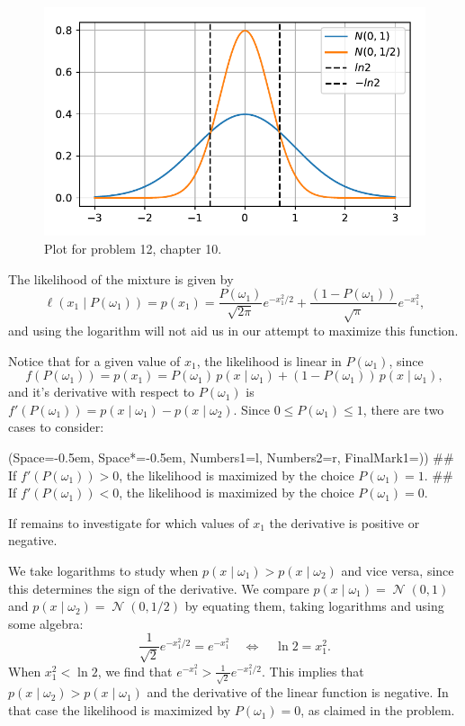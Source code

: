 \documentclass[12pt, a4paper]{article}
\newcommand{\listSpace}{-0.5em}%
\DeclareMathOperator{\N}{\mathcal{N}}
\begin{document}
{\begin{easylist}[enumerate]
		\begin{figure}[ht!]
			\centering
			\includegraphics[width=0.6\linewidth]{figs/duda_ch10_prob12.pdf}
			\caption{Plot for problem 12, chapter 10.}
			\label{fig:ch10_prob12}
		\end{figure}
	
	
	The likelihood of the mixture is given by 
	\begin{equation*}
		\ell (x_1 \mid  P(\omega_1)) = p(x_1) = \frac{P(\omega_1)}{\sqrt{2 \pi}} e^{-x_1^2 / 2}
		+
		\frac{(1 - P(\omega_1))}{\sqrt{ \pi}} e^{-x_1^2 },
	\end{equation*}
	and using the logarithm will not aid us in our attempt to maximize this function.
	
	Notice that for a given value of $x_1$, the likelihood is linear in $P(\omega_1)$, since
	\begin{equation*}
		f( P(\omega_1) ) = p(x_1) = P(\omega_1) \, p(x \mid \omega_1) + (1 - P(\omega_1)) \, p(x \mid \omega_1),
	\end{equation*}
	and it's derivative with respect to $P( \omega_1)$ is $f'(P( \omega_1)) = p(x \mid \omega_1) - p(x \mid \omega_2)$.
	Since $0 \leq P(\omega_1) \leq 1$, there are two cases to consider:
	
	\begin{easylist}[enumerate]
		\ListProperties(Space=\listSpace, Space*=\listSpace, Numbers1=l, Numbers2=r, FinalMark1={)})
	## If $f'(P( \omega_1))  > 0$, the likelihood is maximized by the choice $P(\omega_1) = 1$.
	## If $f'(P( \omega_1)) < 0$, the likelihood is maximized by the choice $P(\omega_1) = 0$.
	\end{easylist}
	
	If remains to investigate for which values of $x_1$ the derivative is positive or negative.
	
	We take logarithms to study when $p(x \mid \omega_1) > p(x \mid \omega_2)$ and vice versa, since this determines the sign of the derivative.
	We compare $p(x \mid \omega_1) = \N(0, 1)$ and $p(x \mid \omega_2) = \N(0, 1/2)$ by equating them, taking logarithms and using some algebra:
	\begin{equation*}
	\frac{1}{\sqrt{2}} e^{-x_1^2 / 2}
	=
	e^{-x_1^2 }
	\quad
	\Leftrightarrow
	\quad
	\ln 2 = x_1^2.
	\end{equation*}
	When $x_1^2 < \ln 2$, we find that $e^{-x_1^2 } > \frac{1}{\sqrt{2}} e^{-x_1^2 / 2}$.
	This implies that $p(x \mid \omega_2) > p(x \mid \omega_1)$ and the derivative of the linear function is negative.
	In that case the likelihood is maximized by $P(\omega_1) = 0$, as claimed in the problem.
\end{easylist}
	
}
\end{document}
